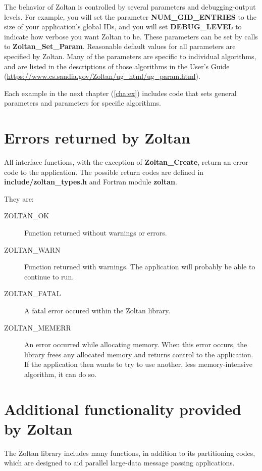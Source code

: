 The behavior of Zoltan is controlled by several parameters and debugging-output 
levels. 
For example, you will set the parameter \textbf{NUM\_GID\_ENTRIES} to the
size of your application's global IDs, and you will set \textbf{DEBUG\_LEVEL}
to indicate how verbose you want Zoltan to be.
These parameters can be set by calls to \textbf{Zoltan\_Set\_Param}. Reasonable 
default values for all parameters are specified by Zoltan. Many of the parameters 
are specific to individual algorithms, and are listed in the descriptions of those 
algorithms in the User's Guide 
(\url{https://www.cs.sandia.gov/Zoltan/ug\_html/ug\_param.html}).

Each example in the next chapter (\ref{cha:ex}) includes code that sets 
general parameters and parameters for specific algorithms.

\section{Errors returned by Zoltan}

All interface functions, with the exception of \textbf{Zoltan\_Create}, return an 
error code to the application. The possible return codes are defined in 
\textbf{include/zoltan\_types.h} and Fortran module \textbf{zoltan}.

They are:

\begin{description}
\item [ZOLTAN\_OK] Function returned without warnings or errors.
\item [ZOLTAN\_WARN] Function returned with warnings. The application will probably be able to continue to run.
\item [ZOLTAN\_FATAL] A fatal error occured within the Zoltan library.
\item [ZOLTAN\_MEMERR] An error occurred while allocating memory. When this error occurs, the library frees any allocated memory and returns control to the application. If the application then wants to try to use another, less memory-intensive algorithm, it can do so.
\end{description}

\section{Additional functionality provided by Zoltan}

The Zoltan library includes many functions, in addition to its
partitioning codes, which are designed to aid parallel
large-data message passing applications.

